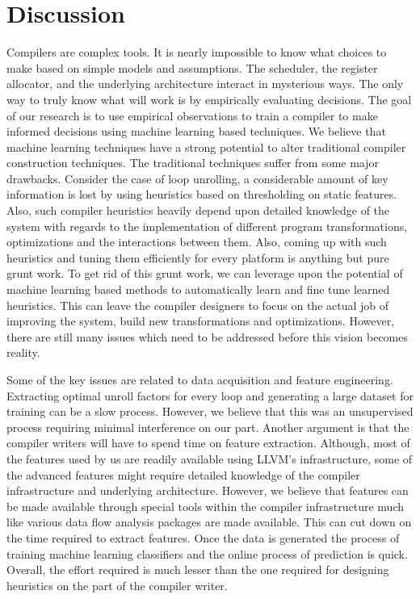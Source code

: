 \documentclass[]{sig-alternate}
\begin{document}
\section{Discussion}
\label{sec:Discussion}
Compilers are complex tools. It is nearly impossible to know what choices to make based on simple models and assumptions. The scheduler, the register allocator, and the underlying architecture interact in mysterious ways. The only way to truly know what will work is by empirically evaluating decisions. The goal of our research is to use empirical observations to train a compiler to make informed decisions using machine learning based techniques. We believe that machine learning techniques have a strong potential to alter traditional compiler construction techniques. The traditional techniques suffer from some major drawbacks. Consider the case of loop unrolling,  a considerable amount of key information is lost by using heuristics based on thresholding on static features. Also, such compiler heuristics heavily depend upon detailed  knowledge of the system with regards to the implementation of different program transformations, optimizations and the interactions between them. Also, coming up with such heuristics and tuning them efficiently for every platform is anything but pure grunt work. To get rid of this grunt work, we can leverage upon the potential of machine learning based methods to automatically learn and fine tune learned heuristics. This can leave the compiler designers to focus on the actual job of improving the system, build new transformations and optimizations.  However, there are still many issues which need to be addressed before this vision becomes reality. 

Some of the key issues are related to data acquisition and feature engineering. Extracting optimal unroll factors for every loop and generating a large dataset for training can be a  slow process. However, we believe that this was an unsupervised process requiring minimal interference on our part. Another argument is that the compiler writers will have to spend time on feature extraction. Although, most of the features used by us are readily available using LLVM's infrastructure, some of the advanced features might require detailed knowledge of the compiler infrastructure and underlying architecture. However, we believe that features can be made available through special tools within the compiler infrastructure much like various data flow analysis packages are made available. This can cut down on the time required to extract features. Once the data is generated the process of training machine learning classifiers and the online process of prediction is quick. Overall, the effort required is much lesser than the one required for designing heuristics on the part of the compiler writer.  
\end{document}
